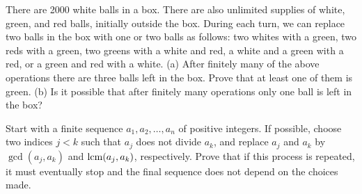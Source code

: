 \documentclass{article}
\begin{document}
    \begin{exercise}
        There are 2000 white balls in a box. There are also unlimited supplies of white, green, and red balls, initially outside the box. During each turn, we can replace two balls in the box with one or two balls as follows: two whites with a green, two reds with a green, two greens with a white and red, a white and a green with a red, or a green and red with a white. (a) After finitely many of the above operations there are three balls left in the box. Prove that at least one of them is green. (b) Is it possible that after finitely many operations only one ball is left in the box?
    \end{exercise}
    
    \begin{exercise}[2008 A3]
    Start with a finite sequence $a_1,a_2,\dots,a_n$ of positive integers. If possible, choose two indices $j < k$ such that $a_j$ does not divide $a_k$, and replace $a_j$ and $a_k$ by $\gcd(a_j , a_k )$ and $\operatorname{lcm}(a_j , a_k )$, respectively. Prove that if this process is repeated, it must eventually stop and the final sequence does not depend on the choices made.
    \end{exercise}
\end{document}
